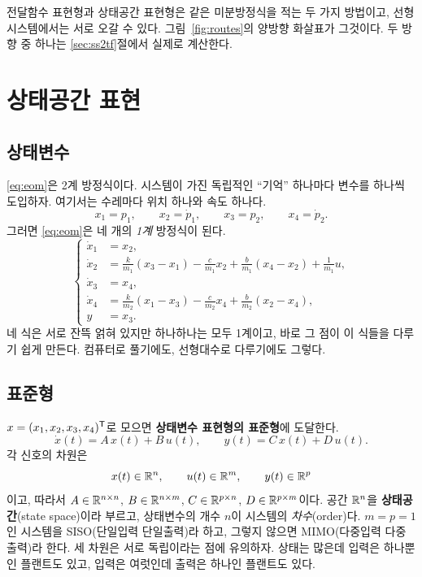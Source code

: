 \documentclass[11pt]{article}
\begin{document}
전달함수 표현형과 상태공간 표현형은 같은 미분방정식을 적는 두 가지 방법이고,
선형 시스템에서는 서로 오갈 수 있다. 그림~\ref{fig:routes}의 양방향 화살표가
그것이다. 두 방향 중 하나는 \ref{sec:ss2tf}절에서 실제로 계산한다.


\section{상태공간 표현}

\subsection{상태변수}
\eqref{eq:eom}은 2계 방정식이다. 시스템이 가진 독립적인 ``기억'' 하나마다 변수를
하나씩 도입하자. 여기서는 수레마다 위치 하나와 속도 하나다.
\[
   x_1 = p_1,\qquad x_2=\dot p_1,\qquad x_3=p_2,\qquad x_4=\dot p_2 .
\]
그러면 \eqref{eq:eom}은 네 개의 \emph{1계} 방정식이 된다.
\begin{equation}\label{eq:statelines}
\left\{
\begin{aligned}
   \dot x_1 &= x_2, \\
   \dot x_2 &= \frac{k}{m_1}(x_3-x_1) - \frac{c}{m_1}x_2 + \frac{b}{m_1}(x_4-x_2) + \frac{1}{m_1}u, \\
   \dot x_3 &= x_4, \\
   \dot x_4 &= \frac{k}{m_2}(x_1-x_3) - \frac{c}{m_2}x_4 + \frac{b}{m_2}(x_2-x_4), \\
   y &= x_3 .
\end{aligned}\right.
\end{equation}
네 식은 서로 잔뜩 얽혀 있지만 하나하나는 모두 1계이고, 바로 그 점이 이 식들을
다루기 쉽게 만든다. 컴퓨터로 풀기에도, 선형대수로 다루기에도 그렇다.

\subsection{표준형}\label{sec:stdform}
$x=(x_1,x_2,x_3,x_4)^{\mathsf{T}}$로 모으면 \textbf{상태변수 표현형의 표준형}에 도달한다.
\begin{equation}\label{eq:std}
   \boxed{\;\dot x(t) = A\,x(t) + B\,u(t),\qquad y(t) = C\,x(t) + D\,u(t).\;}
\end{equation}
각 신호의 차원은
\begin{equation}\label{eq:dims}
   x(t)\in\mathbb{R}^{n},\qquad u(t)\in\mathbb{R}^{m},\qquad y(t)\in\mathbb{R}^{p}
\end{equation}
이고, 따라서 $A\in\mathbb{R}^{n\times n}$, $B\in\mathbb{R}^{n\times m}$, $C\in\mathbb{R}^{p\times n}$,
$D\in\mathbb{R}^{p\times m}$이다. 공간 $\mathbb{R}^{n}$을 \textbf{상태공간}(state space)이라
부르고, 상태변수의 개수 $n$이 시스템의 \emph{차수}(order)다. $m=p=1$인 시스템을
SISO(단일입력 단일출력)라 하고, 그렇지 않으면 MIMO(다중입력 다중출력)라 한다.
세 차원은 서로 독립이라는 점에 유의하자. 상태는 많은데 입력은 하나뿐인 플랜트도
있고, 입력은 여럿인데 출력은 하나인 플랜트도 있다.
\end{document}
